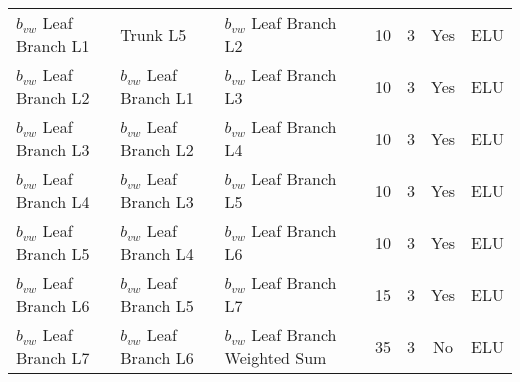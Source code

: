 \documentclass[11pt]{article}
\numberwithin{equation}{section}
\theoremstyle{plain}
\theoremstyle{definition}
\begin{document}
\begin{sidewaystable}[]
{\begin{tabular}{lllcccc}
$b_{vw}$ Leaf Branch L1                      & Trunk L5                                                       & $b_{vw}$ Leaf Branch L2                                            & 10                                     & 3                                            & Yes                                      & ELU                                      \\ 
$b_{vw}$ Leaf Branch L2                      & $b_{vw}$ Leaf Branch L1                                                & $b_{vw}$ Leaf Branch L3                                            & 10                                     & 3                                            & Yes                                      & ELU                                      \\ 
$b_{vw}$ Leaf Branch L3                      & $b_{vw}$ Leaf Branch L2                                                & $b_{vw}$ Leaf Branch L4                                            & 10                                     & 3                                            & Yes                                      & ELU                                      \\ 
$b_{vw}$ Leaf Branch L4                      & $b_{vw}$ Leaf Branch L3                                                & $b_{vw}$ Leaf Branch L5                                            & 10                                     & 3                                            & Yes                                      & ELU                                      \\ 
$b_{vw}$ Leaf Branch L5                      & $b_{vw}$ Leaf Branch L4                                                & $b_{vw}$ Leaf Branch L6                                       & 10                                     & 3                                            & Yes                                       & ELU                                      \\ 
$b_{vw}$ Leaf Branch L6                      & $b_{vw}$ Leaf Branch L5                                                & $b_{vw}$ Leaf Branch L7                                       & 15                                     & 3                                            & Yes                                       & ELU                                      \\ 
$b_{vw}$ Leaf Branch L7                      & $b_{vw}$ Leaf Branch L6                                                & $b_{vw}$ Leaf Branch Weighted Sum                                       & 35                                     & 3                                            & No                                       & ELU                                      \\ 

\end{tabular}}
\end{sidewaystable}
\end{document}
